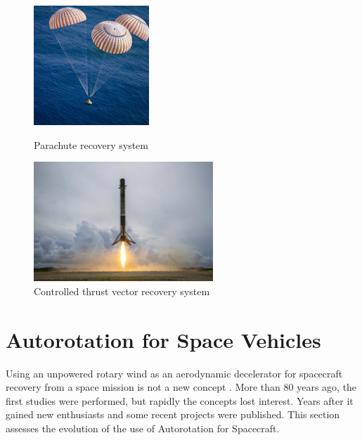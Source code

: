 \begin{figure}
    \centering
    \begin{minipage}{.45\textwidth}
      \centering
     \includegraphics[height=45mm]{Figures/introduction/parachute-system.jpg}
      \caption[Parachute recovery system]{Parachute recovery system \cite{noauthor_wikipedia_nodate}}
      \label{fig:parachute-system}
    \end{minipage}%
    \begin{minipage}{.05\textwidth}
         \text{ }
    \end{minipage}
    \begin{minipage}{.45\textwidth}
      \centering
      \includegraphics[height=45mm]{Figures/introduction/rocjet-thrust-vector.jpg}
      \caption[Controlled thrust vector recovery system]{Controlled thrust vector recovery system \cite{noauthor_spacex_nodate}}
      \label{fig:thurst-vector}
    \end{minipage}
\end{figure}

\section{Autorotation for Space Vehicles}
\label{section:autorotation_vehicles}

Using an unpowered rotary wind as an aerodynamic decelerator for spacecraft recovery from a space mission is not a new concept \cite{diaz-silva_rotary_2013}. More than 80 years ago, the first studies were performed, but rapidly the concepts lost interest. Years after it gained new enthusiasts and some recent projects were published. This section assesses the evolution of the use of Autorotation for Spacecraft.

